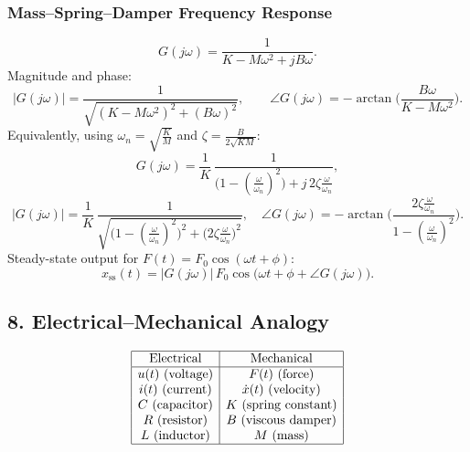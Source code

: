 \documentclass[12pt,a4paper]{article}
\begin{document}
	\subsubsection*{Mass--Spring--Damper Frequency Response}
	$$
	G(j\omega) = \frac{1}{K - M\omega^2 + j B \omega}.
	$$
	Magnitude and phase:
	$$
	|G(j\omega)| = \frac{1}{\sqrt{(K - M\omega^2)^2 + (B \omega)^2}}, \qquad
	\angle G(j\omega) = -\arctan\!\Big(\frac{B \omega}{K - M\omega^2}\Big).
	$$
	Equivalently, using $\omega_n = \sqrt{\tfrac{K}{M}}$ and $\zeta = \tfrac{B}{2\sqrt{KM}}$:
	$$
	G(j\omega) = \frac{1}{K}\,\frac{1}{\Big(1 - (\tfrac{\omega}{\omega_n})^2\Big) + j \, 2\zeta \tfrac{\omega}{\omega_n}},
	$$
	$$
	|G(j\omega)| = \frac{1}{K}\,\frac{1}{\sqrt{\Big(1 - (\tfrac{\omega}{\omega_n})^2\Big)^2 + \big(2\zeta \tfrac{\omega}{\omega_n}\big)^2}},
	\quad
	\angle G(j\omega) = -\arctan\!\Big(\frac{2\zeta \tfrac{\omega}{\omega_n}}{1 - (\tfrac{\omega}{\omega_n})^2}\Big).
	$$
	Steady-state output for $F(t) = F_0 \cos(\omega t + \phi)$:
	$$
	x_{\text{ss}}(t) = |G(j\omega)| \, F_0 \cos\big(\omega t + \phi + \angle G(j\omega)\big).
	$$
	
	\subsection*{8. Electrical--Mechanical Analogy}
	\[
	\begin{array}{|c|c|}
		\hline
		\text{Electrical} & \text{Mechanical} \\
		\hline
		u(t) \ \text{(voltage)} & F(t) \ \text{(force)} \\
		i(t) \ \text{(current)} & \dot{x}(t) \ \text{(velocity)} \\
		C \ \text{(capacitor)} & K \ \text{(spring constant)} \\
		R \ \text{(resistor)} & B \ \text{(viscous damper)} \\
		L \ \text{(inductor)} & M \ \text{(mass)} \\
		\hline
	\end{array}
	\]
	
	
	
	
\end{document}
